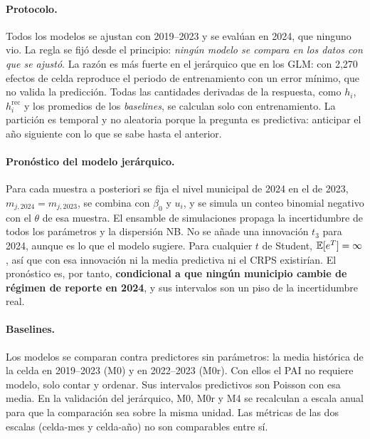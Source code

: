 \paragraph{Protocolo.} Todos los modelos se ajustan con 2019--2023 y se
evalúan en 2024, que ninguno vio. La regla se fijó desde el principio:
\emph{ningún modelo se compara en los datos con que se ajustó}. La razón es
más fuerte en el jerárquico que en los GLM: con 2,270 efectos de celda
reproduce el periodo de entrenamiento con un error mínimo, que no valida la predicción. Todas
las cantidades derivadas de la respuesta, como $h_i$, $h_i^{\text{rec}}$ y
los promedios de los \emph{baselines}, se calculan solo con entrenamiento.
La partición es temporal y no aleatoria porque la pregunta es predictiva:
anticipar el año siguiente con lo que se sabe hasta el anterior.

\paragraph{Pronóstico del modelo jerárquico.} Para cada muestra a posteriori
se fija el nivel municipal de 2024 en el de 2023,
$m_{j,2024} = m_{j,2023}$, se combina con $\beta_0$ y $u_i$, y se simula un
conteo binomial negativo con el $\theta$ de esa muestra. El ensamble de
simulaciones propaga la incertidumbre de todos los parámetros y la
dispersión NB. No se añade una innovación $t_3$ para 2024, aunque es lo que
el modelo sugiere. Para cualquier $t$ de Student, $\mathbb{E}[e^{T}] = \infty$, así
que con esa innovación ni la media predictiva ni el CRPS existirían. El
pronóstico es, por tanto, \textbf{condicional a que ningún municipio cambie
	de régimen de reporte en 2024}, y sus intervalos son un piso de la
incertidumbre real.

\paragraph{Baselines.} Los modelos se comparan contra predictores sin
parámetros: la media histórica de la celda en 2019--2023 (M0) y en
2022--2023 (M0r). Con ellos el PAI no requiere modelo, solo contar y
ordenar. Sus intervalos predictivos son Poisson con esa media. En la
validación del jerárquico, M0, M0r y M4 se recalculan a escala anual para
que la comparación sea sobre la misma unidad. Las métricas de las dos
escalas (celda-mes y celda-año) no son comparables entre sí.

